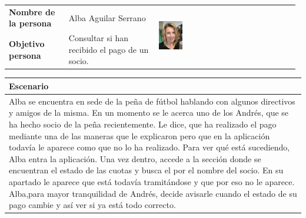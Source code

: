 \documentclass[11pt]{article}
\begin{document}
\begin{table}[H]
	\centering
	\begin{tabular}{p{0.2\linewidth}|p{0.3\linewidth}p{0.475\linewidth}}
		\toprule
		\textbf{Nombre de la persona} & Alba Aguilar Serrano &\multirow{2}{*}{\begin{minipage}{1.\textwidth}\includegraphics[width=0.18\textwidth, height=26mm]{Alba}\end{minipage}}\\
		\textbf{Objetivo persona} & Consultar si han recibido el pago de un socio.  \\
		\bottomrule
	\end{tabular}
	
	\begin{tabular}{p{1.028\linewidth}}
		\textbf{Escenario}\\
		\midrule
		Alba se encuentra en sede de la peña de fútbol hablando con algunos directivos y amigos de la misma. En un momento se le acerca uno de los Andrés, que se ha hecho socio de la peña recientemente. Le dice, que ha realizado el pago mediante una de las maneras que le explicaron pero que en la aplicación todavía le aparece como que no lo ha realizado. Para ver qué está sucediendo, Alba entra la aplicación. Una vez dentro, accede a la sección donde se encuentran el estado de las cuotas y busca el por el nombre del socio. En su apartado le aparece que está todavía tramitándose y que por eso no le aparece. Alba,para mayor tranquilidad de Andrés, decide avisarle cuando el estado de su pago cambie y así ver si ya está todo correcto. 
	\end{tabular}
\end{table}
\end{document}
